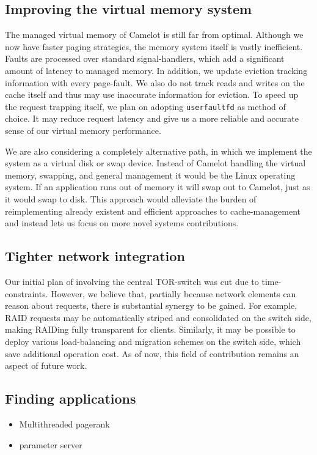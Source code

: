 \subsection{Improving the virtual memory system}
The managed virtual memory of Camelot is still far from optimal. Although we now have faster paging strategies, the memory system itself is vastly inefficient. Faults are processed over standard signal-handlers, which add a significant amount of latency to managed memory. In addition, we update eviction tracking information with every page-fault. We also do not track reads and writes on the cache itself and thus may use inaccurate information for eviction.
To speed up the request trapping itself, we plan on adopting \texttt{userfaultfd} as method of choice. It may reduce request latency and give us a more reliable and accurate sense of our virtual memory performance.

We are also considering a completely alternative path, in which we implement the system as a virtual disk or swap device. Instead of Camelot handling the virtual memory, swapping, and general management it would be the Linux operating system. If an application runs out of memory it will swap out to Camelot, just as it would swap to disk. This approach would alleviate the burden of reimplementing already existent and efficient approaches to cache-management and instead lets us focus on more novel systems contributions.

\subsection{Tighter network integration}
Our initial plan of involving the central TOR-switch was cut due to time-constraints. However, we believe that, partially because network elements can reason about requests, there is substantial synergy to be gained. For example, RAID requests may be automatically striped and consolidated on the switch side, making RAIDing fully transparent for clients. Similarly, it may be possible to deploy various load-balancing and migration schemes on the switch side, which save additional operation cost. 
As of now, this field of contribution remains an aspect of future work.
\subsection{Finding applications}
\begin{itemize}
\item Multithreaded pagerank
\item parameter server
\end{itemize}


\label{sec:future}
